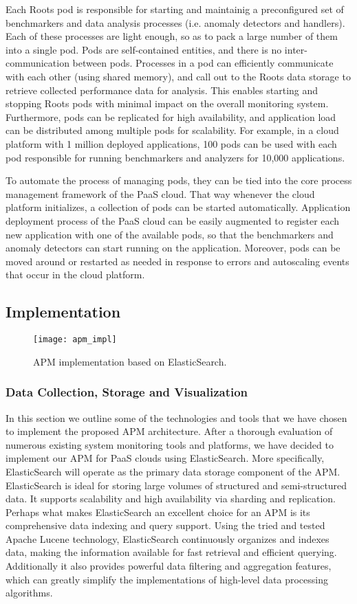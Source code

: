 Each Roots pod is responsible for starting and maintainig a preconfigured set of
benchmarkers and data analysis processes (i.e. anomaly detectors and handlers). 
Each of these processes are light enough, so as to pack a large number of them
into a single pod. Pods are self-contained entities, and there is no inter-communication
between pods. Processes in a pod can efficiently communicate with each other 
(using shared memory), and call out to the Roots data storage to retrieve 
collected performance data for analysis. This enables starting and stopping 
Roots pods with minimal impact on the overall monitoring system. Furthermore, pods
can be replicated for high availability, and application load can be distributed
among multiple pods for scalability. For example, in a cloud platform with
1 million deployed applications, 100 pods can be used with each pod responsible
for running benchmarkers and analyzers for 10,000 applications.

To automate the process of managing pods, they can be tied into the core
process management framework of the PaaS cloud. That way whenever the cloud
platform initializes, a collection of pods can be started automatically.
Application deployment process of the PaaS cloud can be easily augmented
to register each new application with one of the available pods, so that the
benchmarkers and anomaly detectors can start running on the application.
Moreover, pods can be moved around or restarted as needed in response
to errors and autoscaling events that occur in the cloud platform.

\subsection{Implementation}
\begin{figure}
\centering
\texttt{[image: apm\_impl]}
\caption{APM implementation based on ElasticSearch.}
\label{fig:apm_impl}
\end{figure}

\subsubsection{Data Collection, Storage and Visualization}
In this section we outline some of the technologies and tools that we have chosen to implement the proposed
APM architecture.  After a thorough evaluation of numerous existing system monitoring tools and platforms, 
we have decided to implement our APM for PaaS clouds using ElasticSearch. More specifically, ElasticSearch
will operate as the primary data storage component of the APM. ElasticSearch is ideal for storing large volumes
of structured and semi-structured data. It supports scalability and high availability via sharding and replication.
Perhaps what makes ElasticSearch an excellent choice for an APM is its comprehensive data indexing and
query support. Using the tried and tested Apache Lucene technology, ElasticSearch continuously organizes
and indexes data, making the information available for fast retrieval and efficient querying. 
Additionally it also provides
powerful data filtering and aggregation features, which can greatly simplify the implementations of high-level
data processing algorithms.

